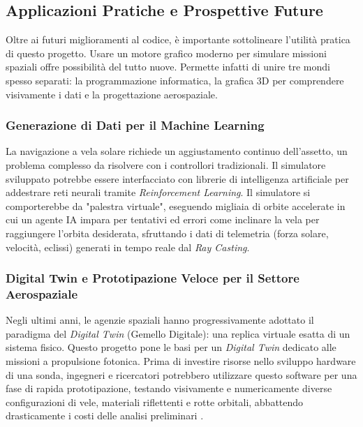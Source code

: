 
\subsection{Applicazioni Pratiche e Prospettive Future}
Oltre ai futuri miglioramenti al codice, è importante sottolineare l'utilità pratica di questo progetto. Usare un motore grafico moderno per simulare missioni spaziali offre possibilità del tutto nuove. Permette infatti di unire tre mondi spesso separati: la programmazione informatica, la grafica 3D per comprendere visivamente i dati e la progettazione aerospaziale.

\subsubsection{Generazione di Dati per il Machine Learning}
La navigazione a vela solare richiede un aggiustamento continuo dell'assetto, un problema complesso da risolvere con i controllori tradizionali. Il simulatore sviluppato potrebbe essere interfacciato con librerie di intelligenza artificiale per addestrare reti neurali tramite \textit{Reinforcement Learning}. Il simulatore si comporterebbe da "palestra virtuale", eseguendo migliaia di orbite accelerate in cui un agente IA impara per tentativi ed errori come inclinare la vela per raggiungere l'orbita desiderata, sfruttando i dati di telemetria (forza solare, velocità, eclissi) generati in tempo reale dal \textit{Ray Casting}.

\subsubsection{Digital Twin e Prototipazione Veloce per il Settore Aerospaziale}
Negli ultimi anni, le agenzie spaziali hanno progressivamente adottato il paradigma del \textit{Digital Twin} (Gemello Digitale): una replica virtuale esatta di un sistema fisico. Questo progetto pone le basi per un \textit{Digital Twin} dedicato alle missioni a propulsione fotonica. Prima di investire risorse nello sviluppo hardware di una sonda, ingegneri e ricercatori potrebbero utilizzare questo software per una fase di rapida prototipazione, testando visivamente e numericamente diverse configurazioni di vele, materiali riflettenti e rotte orbitali, abbattendo drasticamente i costi delle analisi preliminari \cite{macdonald2011applications}.

